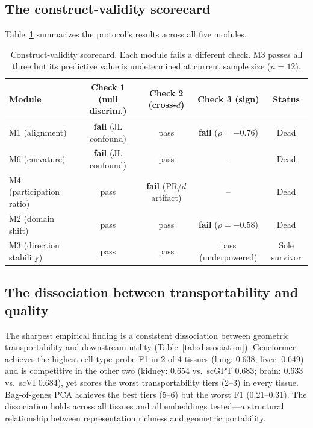 \documentclass[10pt,letterpaper]{article}
\begin{document}
\subsection{The construct-validity scorecard}

Table~\ref{tab:scorecard} summarizes the protocol's results across all five modules.

\begin{table}[t]
\centering
\caption{Construct-validity scorecard. Each module fails a different check. M3 passes all three but its predictive value is undetermined at current sample size ($n = 12$).}
\label{tab:scorecard}
\small
\begin{tabular}{@{}lcccc@{}}
\toprule
Module & Check 1 (null discrim.) & Check 2 (cross-$d$) & Check 3 (sign) & Status \\
\midrule
M1 (alignment) & \textbf{fail} (JL confound) & pass & \textbf{fail} ($\rho = -0.76$) & Dead \\
M6 (curvature) & \textbf{fail} (JL confound) & pass & -- & Dead \\
M4 (participation ratio) & pass & \textbf{fail} (PR/$d$ artifact) & -- & Dead \\
M2 (domain shift) & pass & pass & \textbf{fail} ($\rho = -0.58$) & Dead \\
M3 (direction stability) & pass & pass & pass (underpowered) & Sole survivor \\
\bottomrule
\end{tabular}
\end{table}

\subsection{The dissociation between transportability and quality}

The sharpest empirical finding is a consistent dissociation between geometric transportability and downstream utility (Table~\ref{tab:dissociation}). Geneformer achieves the highest cell-type probe F1 in 2 of 4 tissues (lung: 0.638, liver: 0.649) and is competitive in the other two (kidney: 0.654 vs.\ scGPT 0.683; brain: 0.633 vs.\ scVI 0.684), yet scores the worst transportability tiers (2--3) in every tissue. Bag-of-genes PCA achieves the best tiers (5--6) but the worst F1 (0.21--0.31). The dissociation holds across all tissues and all embeddings tested---a structural relationship between representation richness and geometric portability.
\end{document}
